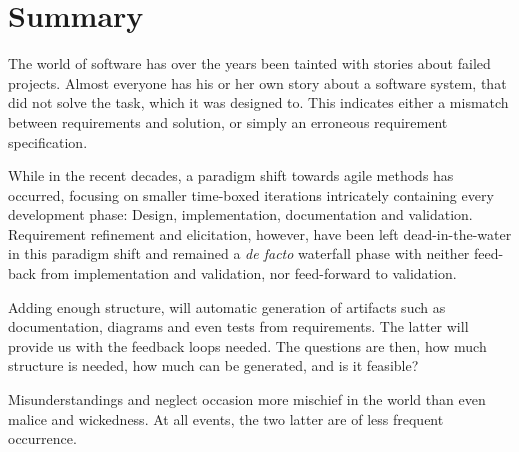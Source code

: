 \chapter{Summary}
The world of software has over the years been tainted with stories about failed projects. Almost everyone has his or her own story about a software system, that did not solve the task, which it was designed to. This indicates either a mismatch between requirements and solution, or simply an erroneous requirement specification.\medskip

\noindent While in the recent decades, a paradigm shift towards agile methods has occurred, focusing on smaller time-boxed iterations intricately containing every development phase: Design, implementation, documentation and validation. Requirement refinement and elicitation, however, have been left dead-in-the-water in this paradigm shift and remained a \emph{de facto} waterfall phase with neither feed-back from implementation and validation, nor feed-forward to validation.\bigskip

\noindent Adding enough structure, will automatic generation of artifacts such as documentation, diagrams and even tests from requirements. The latter will provide us with the feedback loops needed. The questions are then, how much structure is needed, how much can be generated, and is it feasible?

\newpage
\begin{fquote}Misunderstandings and neglect occasion more mischief in the world than even malice and wickedness. At all events, the two latter are of less frequent occurrence.
\end{fquote}